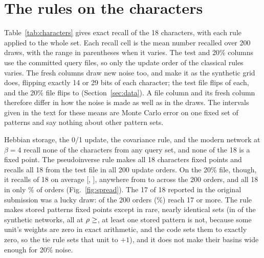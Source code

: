 \section{The rules on the characters}
\label{sec:characters}

Table~\ref{tab:characters} gives exact recall of the 18 characters, with each rule applied to the whole set. Each recall cell is the mean number recalled over 200 draws, with the range in parentheses when it varies. The test and 20\% columns use the committed query files, so only the update order of the classical rules varies. The fresh columns draw new noise too, and make it as the synthetic grid does, flipping exactly 14 or 29 bits of each character; the test file flips  of each, and the 20\% file flips  to  (Section~\ref{sec:data}). A file column and its fresh column therefore differ in how the noise is made as well as in the draws. The intervals given in the text for these means are Monte Carlo error on one fixed set of patterns and say nothing about other pattern sets.

\begin{table}[t]
\caption{Exact recall of the 18 characters (of 18): mean over 200 draws, with the range in parentheses when it varies, and, in the last column, the number of the 18 characters that are fixed points (for the modern network, that come back unchanged from a clean query). Storkey uses the file order of the patterns.}
\label{tab:characters}
\centering
\scriptsize
\setlength{\tabcolsep}{3pt}

\end{table}

Hebbian storage, the 0/1 update, the covariance rule, and the modern network at $\beta = 4$ recall none of the characters from any query set, and none of the 18 is a fixed point. The pseudoinverse rule makes all 18 characters fixed points and recalls all 18 from the test file in all 200 update orders. On the 20\% file, though, it recalls  of 18 on average [, ], anywhere from  to  across the 200 orders, and all 18 in only \% of orders (Fig.~\ref{fig:spread}). The 17 of 18 reported in the original submission was a lucky draw:  of the 200 orders (\%) reach 17 or more. The rule makes stored patterns fixed points except in rare, nearly identical sets (in  of the  synthetic networks, all at $\rho \ge \N{pfx:minlevel}$, at least one stored pattern is not, because some unit's weights are zero in exact arithmetic, and the code sets them to exactly zero, so the tie rule sets that unit to $+1$), and it does not make their basins wide enough for 20\% noise.

